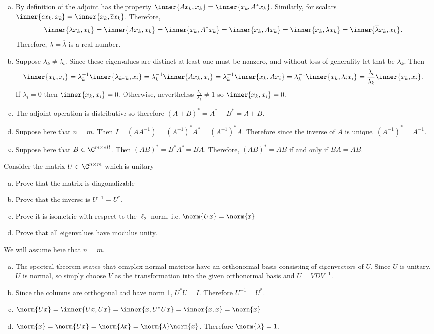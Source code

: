 \documentclass[letter, 12pt]{article}
\begin{document}
\begin{enumerate}[(a)]
\item By definition of the adjoint has the property $\inner{Ax_k,x_k} = \inner{x_k,A^*x_k}$. Similarly, for scalars $\inner{cx_k,x_k} = \inner{x_k,\overline{c}x_k}$. Therefore,
\[
\inner{\lambda x_k,x_k} = \inner{A x_k,x_k} = \inner{x_k,A^*x_k} = \inner{x_k,Ax_k} = \inner{x_k,\lambda x_k} = \inner{\overline{\lambda}x_k,x_k}.
\]
Therefore, $\lambda = \overline{\lambda}$ is a real number.
\item Suppose $\lambda_k \neq \lambda_i$. Since these eigenvalues are distinct at least one must be nonzero, and without loss of generality let that be $\lambda_k$. Then
\[
\inner{x_k,x_i} = \lambda_k^{-1}\inner{\lambda_kx_k,x_i} = \lambda_k^{-1}\inner{Ax_k,x_i} = \lambda_k^{-1}\inner{x_k,Ax_i} = \lambda_k^{-1}\inner{x_k,\lambda_ix_i} = \frac{\lambda_i}{\lambda_k}\inner{x_k,x_i}.
\]
If $\lambda_i=0$ then $\inner{x_k,x_i} = 0$. Otherwise, nevertheless $\frac{\lambda_i}{\lambda_k}\neq 1$ so $\inner{x_k,x_i}=0$.
\item The adjoint operation is distributive so therefore $(A+B)^* = A^* + B^* = A+B$. 
\item Suppose here that $n=m$. Then $I = (AA^{-1}) = (A^{-1})^*A^* = (A^{-1})^*A$. Therefore since the inverse of $A$ is unique, $(A^{-1})^* = A^{-1}$.
\item Suppose here that $B \in \C^{m\times ell}$. Then $(AB)^* = B^*A^* = BA$. Therefore, $(AB)^* = AB$ if and only if $BA=AB$.

\end{enumerate}

\pagebreak

\begin{problem}
Consider the matrix $U\in \C^{n\times m}$ which is unitary
\begin{enumerate}[(a)]
\item Prove that the matrix is diagonalizable
\item Prove that the inverse is $U^{-1}=U^*$.
\item Prove it is isometric with respect to the $\ell_2$ norm, i.e. $\norm{Ux} = \norm{x}$
\item Prove that all eigenvalues have modulus unity.
\end{enumerate}
\end{problem}

We will assume here that $n=m$.
\begin{enumerate}[(a)]
\item The spectral theorem states that complex normal matrices have an orthonormal basis consisting of eigenvectors of $U$. Since $U$ is unitary, $U$ is normal, so simply choose $V$ as the transformation into the given orthonormal basis and $U = VDV^{-1}$.
\item Since the columns are orthogonal and have norm 1, $U^*U = I$. Therefore $U^{-1} = U^*$.
\item $\norm{Ux} = \inner{Ux,Ux} = \inner{x,U^*Ux} = \inner{x,x} = \norm{x}$
\item $\norm{x} = \norm{Ux} = \norm{\lambda x} = \norm{\lambda}\norm{x}$. Therefore $\norm{\lambda}=1$.
\end{enumerate}

\pagebreak
\end{document}
